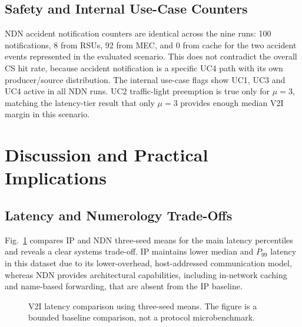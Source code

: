 \documentclass[journal]{IEEEtran}
\begin{document}
\subsection{Safety and Internal Use-Case Counters}

NDN accident notification counters are identical across the nine runs: 100 notifications, 8 from RSUs, 92 from MEC, and 0 from cache for the two accident events represented in the evaluated scenario. This does not contradict the overall CS hit rate, because accident notification is a specific UC4 path with its own producer/source distribution. The internal use-case flags show UC1, UC3 and UC4 active in all NDN runs. UC2 traffic-light preemption is true only for $\mu=3$, matching the latency-tier result that only $\mu=3$ provides enough median V2I margin in this scenario.

\section{Discussion and Practical Implications}
\label{sec:discussion}

\subsection{Latency and Numerology Trade-Offs}

Fig.~\ref{fig:p50p99_v2} compares IP and NDN three-seed means for the main latency percentiles and reveals a clear systems trade-off. IP maintains lower median and $P_{99}$ latency in this dataset due to its lower-overhead, host-addressed communication model, whereas NDN provides architectural capabilities, including in-network caching and name-based forwarding, that are absent from the IP baseline.

\begin{figure}[!t]\centering
{}
\caption{V2I latency comparison using three-seed means. The figure is a bounded baseline comparison, not a protocol microbenchmark.}
\label{fig:p50p99_v2}
\end{figure}
\end{document}
